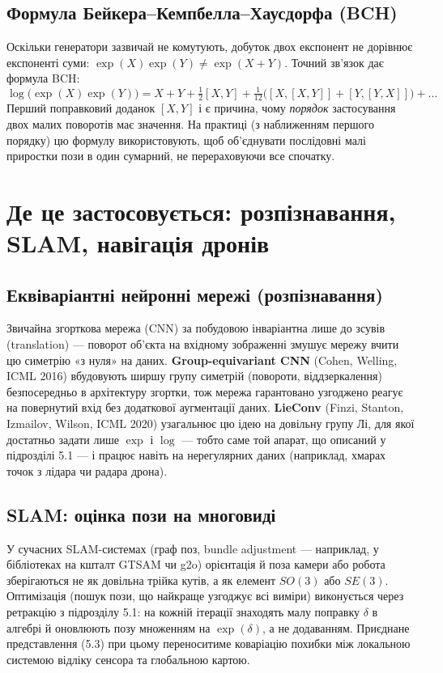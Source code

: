 \documentclass[12pt, a4paper]{article}
\begin{document}
	\subsection{Формула Бейкера--Кемпбелла--Хаусдорфа (BCH)}
	Оскільки генератори зазвичай не комутують, добуток двох експонент не дорівнює експоненті суми: $\exp(X)\exp(Y) \neq \exp(X+Y)$. Точний зв'язок дає формула BCH:
	\[
	\log\big(\exp(X)\exp(Y)\big) = X + Y + \tfrac{1}{2}[X,Y] + \tfrac{1}{12}\big([X,[X,Y]] + [Y,[Y,X]]\big) + \dots
	\]
	Перший поправковий доданок $[X,Y]$ і є причина, чому \emph{порядок} застосування двох малих поворотів має значення. На практиці (з наближенням першого порядку) цю формулу використовують, щоб об'єднувати послідовні малі приростки пози в один сумарний, не перераховуючи все спочатку.
	
	\section{Де це застосовується: розпізнавання, SLAM, навігація дронів}
	
	\subsection{Еквіваріантні нейронні мережі (розпізнавання)}
	Звичайна згорткова мережа (CNN) за побудовою інваріантна лише до зсувів (translation) — поворот об'єкта на вхідному зображенні змушує мережу вчити цю симетрію «з нуля» на даних. \textbf{Group-equivariant CNN} (Cohen, Welling, ICML 2016) вбудовують ширшу групу симетрій (повороти, віддзеркалення) безпосередньо в архітектуру згортки, тож мережа гарантовано узгоджено реагує на повернутий вхід без додаткової аугментації даних. \textbf{LieConv} (Finzi, Stanton, Izmailov, Wilson, ICML 2020) узагальнює цю ідею на довільну групу Лі, для якої достатньо задати лише $\exp$ і $\log$ — тобто саме той апарат, що описаний у підрозділі 5.1 — і працює навіть на нерегулярних даних (наприклад, хмарах точок з лідара чи радара дрона).
	
	\subsection{SLAM: оцінка пози на многовиді}
	У сучасних SLAM-системах (граф поз, bundle adjustment — наприклад, у бібліотеках на кшталт GTSAM чи g2o) орієнтація й поза камери або робота зберігаються не як довільна трійка кутів, а як елемент $SO(3)$ або $SE(3)$. Оптимізація (пошук пози, що найкраще узгоджує всі виміри) виконується через ретракцію з підрозділу 5.1: на кожній ітерації знаходять малу поправку $\delta$ в алгебрі й оновлюють позу множенням на $\exp(\delta)$, а не додаванням. Приєднане представлення (5.3) при цьому переноситиме коваріацію похибки між локальною системою відліку сенсора та глобальною картою.
	
\end{document}
